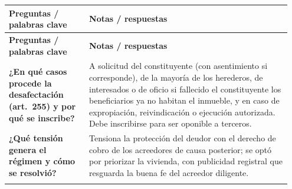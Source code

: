 \documentclass[12pt,oneside]{book}
\makeatletter
\newenvironment{cornell}{%
    \par\vspace{0.5em}
    \noindent
    \begin{longtable}{@{}>{\raggedright\arraybackslash}p{0.27\linewidth}
                         >{\raggedright\arraybackslash}p{0.68\linewidth}@{}}
    \toprule
    \textbf{Preguntas / palabras clave} & \textbf{Notas / respuestas} \\
    \midrule
    \endfirsthead
    \toprule
    \textbf{Preguntas / palabras clave} & \textbf{Notas / respuestas} \\
    \midrule
    \endhead
}{%
    \bottomrule
    \end{longtable}
}
\newcommand{\cornellsummary}[1]{%
    \midrule
    \multicolumn{2}{@{}p{\dimexpr0.95\linewidth+2\tabcolsep\relax}@{}}{%
        \vspace{0.2em}\textbf{Resumen:} #1\vspace{0.2em}} \\
}
\makeatother
\begin{document}
\begin{cornell}
\textbf{¿En qué casos procede la desafectación (art.~255) y por qué se inscribe?} &
A solicitud del constituyente (con asentimiento si corresponde), de la mayoría de los herederos, de interesados o de oficio si fallecido el constituyente los beneficiarios ya no habitan el inmueble, y en caso de expropiación, reivindicación o ejecución autorizada. Debe inscribirse para ser oponible a terceros. \\

\textbf{¿Qué tensión genera el régimen y cómo se resolvió?} &
Tensiona la protección del deudor con el derecho de cobro de los acreedores de causa posterior; se optó por priorizar la vivienda, con publicidad registral que resguarda la buena fe del acreedor diligente. \\

\cornellsummary{El régimen de los arts.~244 a 256 permite al propietario sustraer su vivienda de la ejecución por deudas de causa posterior a la afectación, en beneficio propio o de su familia, mediante escritura pública, testamento o, excepcionalmente, vía judicial. La protección cede frente a deudas de causa anterior, expensas y obligaciones garantizadas con derechos reales, se traslada al precio por subrogación real, exige asentimiento del cónyuge o conviviente beneficiario para transmitir o gravar y se cancela solo por las causas del art.~255. Ante la tensión entre vivienda y acreedores, el ordenamiento optó por proteger la vivienda.}
\end{cornell}
\end{document}
